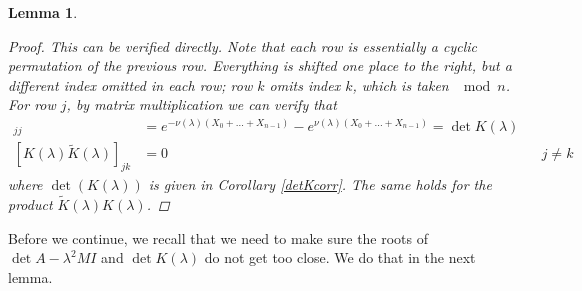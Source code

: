 \documentclass[12pt]{article}
\newtheorem{lemma}{Lemma}
\begin{document}
\begin{lemma}
\begin{proof}
This can be verified directly. Note that each row is essentially a cyclic permutation of the previous row. Everything is shifted one place to the right, but a different index omitted in each row; row $k$ omits index $k$, which is taken $\mod n$. For row $j$, by matrix multiplication we can verify that
\begin{align*}
[K(\lambda)\tilde{K}(\lambda)]_{jj} &= e^{-\nu(\lambda)(X_0 + \dots + X_{n-1})} - e^{\nu(\lambda)(X_0 + \dots + X_{n-1})} = \det K(\lambda) \\
[K(\lambda)\tilde{K}(\lambda)]_{jk} &= 0 && j \neq k
\end{align*}
where $\det(K(\lambda))$ is given in Corollary \ref{detKcorr}. The same holds for the product $\tilde{K}(\lambda)K(\lambda)$.
\end{proof}
\end{lemma}

Before we continue, we recall that we need to make sure the roots of $\det A - \lambda^2 M I$ and $\det K(\lambda)$ do not get too close. We do that in the next lemma.

\end{document}
